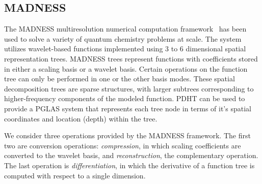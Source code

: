 %
%
%
%


\subsection{MADNESS}

The MADNESS multiresolution numerical computation framework~\cite{thornton09}
has been used to solve a variety of quantum chemistry problems at scale. The
system utilizes wavelet-based functions implemented using 3 to 6 dimensional
spatial representation trees. MADNESS trees represent functions with
coefficients stored in either a scaling basis or a wavelet basis. Certain
operations on the function tree can only be performed in one or the other basis
modes. These spatial decomposition trees are sparse structures, with larger
subtrees corresponding to higher-frequency components of the modeled function.
PDHT can be used to provide a PGLAS system that represents each tree node in
terms of it's spatial coordinates and location (depth) within the tree.

We consider three operations provided by the MADNESS framework. The
first two are conversion operations: {\em compression}, in which scaling
coefficients are converted to the wavelet basis, and {\em reconstruction}, the
complementary operation. The last operation is {\em differentiation}, in which
the derivative of a function tree is computed with respect to a single
dimension. 

